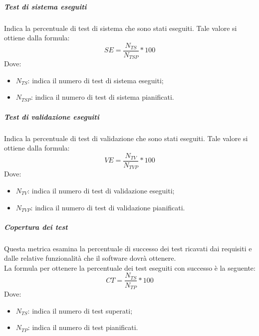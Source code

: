 \documentclass[../NormeDiProgetto_v4.0.0.tex]{subfiles}
\begin{document}
			\subparagraph{Test di sistema eseguiti}
			Indica la percentuale di test di sistema che sono stati eseguiti.
			Tale valore si ottiene dalla formula:
			\begin{equation*}
				SE = \frac{N_{TS}}{N_{TSP}} * 100
			\end{equation*}
			Dove:
			\begin{itemize}
				\item \textbf{$N_{TS}$}: indica il numero di test di sistema eseguiti;
				\item \textbf{$N_{TSP}$}: indica il numero di test di sistema pianificati.
			\end{itemize}
			
			\subparagraph{Test di validazione eseguiti}
			Indica la percentuale di test di validazione che sono stati eseguiti.
			Tale valore si ottiene dalla formula:
			\begin{equation*}
				VE = \frac{N_{TV}}{N_{TVP}} * 100
			\end{equation*}
			Dove:
			\begin{itemize}
				\item \textbf{$N_{TV}$}: indica il numero di test di validazione eseguiti;
				\item \textbf{$N_{TVP}$}: indica il numero di test di validazione pianificati.
			\end{itemize}
			
			\subparagraph{Copertura dei test}
			Questa metrica esamina la percentuale di successo dei test ricavati dai requisiti e dalle relative funzionalità che il software dovrà ottenere.\\La formula per ottenere la percentuale dei test eseguiti con successo è la seguente:
			\begin{equation*}
				CT = \frac{N_{TS}}{N_{TP}} * 100
			\end{equation*}
			Dove:
			\begin{itemize}
				\item \textbf{$N_{TS}$}: indica il numero di test superati;
				\item \textbf{$N_{TP}$}: indica il numero di test pianificati.
			\end{itemize}
\end{document}
